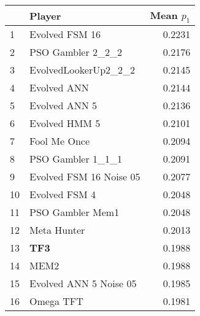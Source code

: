 \begin{tabular}{llr}
\toprule
{} &                   Player &  Mean $p_1$ \\
\midrule
1  &           Evolved FSM 16 &      0.2231 \\
2  &        PSO Gambler 2\_2\_2 &      0.2176 \\
3  &     EvolvedLookerUp2\_2\_2 &      0.2145 \\
4  &              Evolved ANN &      0.2144 \\
5  &            Evolved ANN 5 &      0.2136 \\
6  &            Evolved HMM 5 &      0.2101 \\
7  &             Fool Me Once &      0.2094 \\
8  &        PSO Gambler 1\_1\_1 &      0.2091 \\
9  &  Evolved FSM 16 Noise 05 &      0.2077 \\
10 &            Evolved FSM 4 &      0.2048 \\
11 &         PSO Gambler Mem1 &      0.2048 \\
12 &              Meta Hunter &      0.2013 \\
13 &                      \textbf{TF3} &      0.1988 \\
14 &                     MEM2 &      0.1988 \\
15 &   Evolved ANN 5 Noise 05 &      0.1985 \\
16 &                Omega TFT &      0.1981 \\
\bottomrule
\end{tabular}
